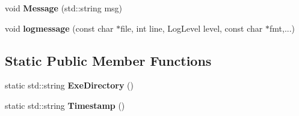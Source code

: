 \begin{DoxyCompactItemize}
\item 
\hypertarget{struct_logging_1_1_c_logger_a3f57dc5b4d526f10aad88ea05f1143f9}{}void {\bfseries Message} (std\+::string msg)\label{struct_logging_1_1_c_logger_a3f57dc5b4d526f10aad88ea05f1143f9}

\item 
\hypertarget{struct_logging_1_1_c_logger_a17391263ef5a00c76f0235ae42c98a3f}{}void {\bfseries logmessage} (const char $\ast$file, int line, Log\+Level level, const char $\ast$fmt,...)\label{struct_logging_1_1_c_logger_a17391263ef5a00c76f0235ae42c98a3f}

\end{DoxyCompactItemize}
\subsection*{Static Public Member Functions}
\begin{DoxyCompactItemize}
\item 
\hypertarget{struct_logging_1_1_c_logger_a942e0b8000052ed65461b83aaaf55d8f}{}static std\+::string {\bfseries Exe\+Directory} ()\label{struct_logging_1_1_c_logger_a942e0b8000052ed65461b83aaaf55d8f}

\item 
\hypertarget{struct_logging_1_1_c_logger_af9cc14ae6b96de411a590dd750ddff5d}{}static std\+::string {\bfseries Timestamp} ()\label{struct_logging_1_1_c_logger_af9cc14ae6b96de411a590dd750ddff5d}

\end{DoxyCompactItemize}

